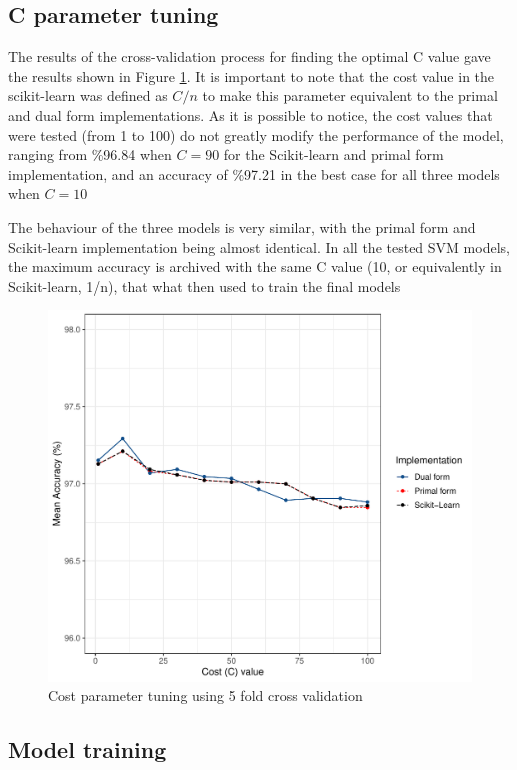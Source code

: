 \documentclass[11pt,twocolumn,letterpaper]{article}
\begin{document}
\subsection{C parameter tuning}

The results of the cross-validation process for finding the optimal C value gave the results shown in Figure \ref{fig:cv_cost}. It is important to note that the cost value in the scikit-learn was defined as $C/n$ to make this parameter equivalent to the primal and dual form implementations. As it is possible to notice, the cost values that were tested (from 1 to 100) do not greatly modify the performance of the model, ranging from \%96.84 when $C = 90$ for the Scikit-learn and primal form implementation, and an accuracy of \%97.21 in the best case for all three models when $C = 10$

The behaviour of the three models is very similar, with the primal form and Scikit-learn implementation being almost identical. In all the tested SVM models, the maximum accuracy is archived with the same C value (10, or equivalently in Scikit-learn, 1/n), that what then used to train the final models

\begin{figure}[h]
	\begin{center}
		\includegraphics[width=0.9\linewidth]{CV_cost.pdf}
	\end{center}
	\caption{Cost parameter tuning using 5 fold cross validation}
	\label{fig:cv_cost}
\end{figure}


\subsection{Model training}
\end{document}
